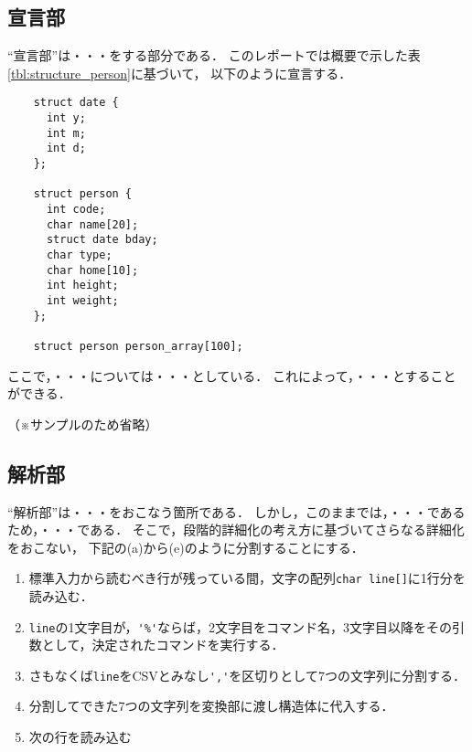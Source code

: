 \documentclass[a4j,11pt]{jarticle}
\begin{document}
\subsection{宣言部} \label{sec:declare}

``宣言部''は・・・をする部分である．
このレポートでは概要で示した表\ref{tbl:structure_person}に基づいて，
以下のように宣言する．

{\fontsize{10pt}{11pt} \selectfont
\begin{verbatim}
    struct date {
      int y;
      int m;
      int d;
    };

    struct person {
      int code;
      char name[20];
      struct date bday;
      char type;
      char home[10];
      int height;
      int weight;
    };

    struct person person_array[100];
\end{verbatim}
}

ここで，・・・については・・・としている．
これによって，・・・とすることができる．

（※サンプルのため省略）

\subsection{解析部} \label{sec:parse}

``解析部''は・・・をおこなう箇所である．
しかし，このままでは，・・・であるため，・・・である．
そこで，段階的詳細化の考え方に基づいてさらなる詳細化をおこない，
下記の(a)から(e)のように分割することにする．

\begin{enumerate}
\setlength{\parskip}{2pt} \setlength{\itemsep}{2pt}
\renewcommand{\labelenumi}{(\alph{enumi})} %
    \item 標準入力から読むべき行が残っている間，文字の配列\verb|char line[]|に1行分を読み込む．
    \item \verb|line|の1文字目が，\verb|'%'|ならば，2文字目をコマンド名，3文字目以降をその引数として，決定されたコマンドを実行する．
    \item さもなくば\verb|line|をCSVとみなし\verb|','|を区切りとして7つの文字列に分割する．
    \item 分割してできた7つの文字列を変換部に渡し構造体に代入する．
    \item 次の行を読み込む
\end{enumerate}
\end{document}

